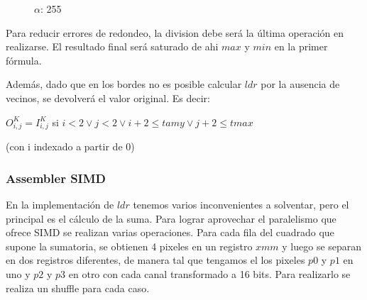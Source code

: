 \begin{figure}
  \centering
  \hfill
  \caption{$\alpha$: 255}
\end{figure}


Para reducir errores de redondeo, la division debe será la última operación en realizarse.
El resultado final será saturado de ahi $max$ y $min$ en la primer fórmula.

Además, dado que en los bordes no es posible calcular $ldr$ por la ausencia de vecinos, se devolverá
el valor original. Es decir:

\begin{center}
$O_{i,j}^{K} = I_{i,j}^{K}$ si $i<2 \vee j<2 \vee i+2 \leq tamy \vee j +2 \leq tmax$
\end{center}

(con i indexado a partir de 0)

\subsubsection{Assembler SIMD}

En la implementación de $ldr$ tenemos varios inconvenientes a solventar, pero el principal es el cálculo de la suma. Para lograr aprovechar el paralelismo que ofrece SIMD se realizan varias operaciones.
Para cada fila del cuadrado que supone la sumatoria, se obtienen 4 pixeles en un registro $xmm$ y luego se separan en dos registros diferentes, de manera tal que tengamos el los pixeles $p0$ y $p1$ en uno y $p2$ y $p3$ en otro con cada canal transformado a 16 bits. Para realizarlo se realiza un shuffle para cada caso.\\

